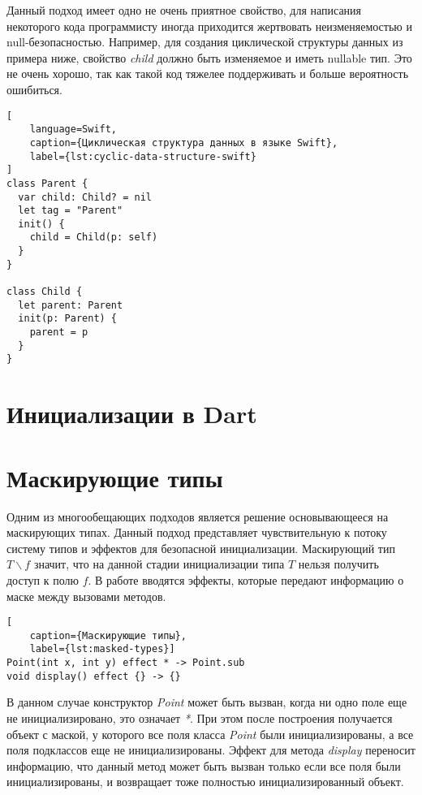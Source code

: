 Данный подход имеет одно не очень приятное свойство, для написания некоторого кода программисту иногда приходится жертвовать
неизменяемостью и null-безопасностью.
Например, для создания циклической структуры данных из примера ниже, свойство \emph{child} должно быть изменяемое и иметь nullable тип.
Это не очень хорошо, так как такой код тяжелее поддерживать и больше вероятность ошибиться.
\begin{lstlisting}[
    language=Swift,
    caption={Циклическая структура данных в языке Swift},
    label={lst:cyclic-data-structure-swift}
]
class Parent {
  var child: Child? = nil
  let tag = "Parent"
  init() {
    child = Child(p: self)
  }
}

class Child {
  let parent: Parent
  init(p: Parent) {
    parent = p
  }
}
\end{lstlisting}

\section{Инициализации в Dart}\label{sec:инициализации-в-dart}



\section{Маскирующие типы}\label{sec:маскирующие-типы}

Одним из многообещающих подходов является решение основывающееся на маскирующих типах\cite{masked-types}.
Данный подход представляет чувствительную к потоку систему типов и эффектов для безопасной инициализации.
Маскирующий тип $T \backslash f$ значит, что на данной стадии инициализации типа $T$ нельзя получить доступ к полю $f$.
В работе вводятся эффекты, которые передают информацию о маске между вызовами методов.
\begin{lstlisting}[
    caption={Маскирующие типы},
    label={lst:masked-types}]
Point(int x, int y) effect * -> Point.sub
void display() effect {} -> {}
\end{lstlisting}
В данном случае конструктор \emph{Point} может быть вызван, когда ни одно поле еще не инициализировано, это означает \emph{*}.
При этом после построения получается объект с маской, у которого все поля класса \emph{Point} были инициализированы,
а все поля подклассов еще не инициализированы.
Эффект для метода \emph{display} переносит информацию, что данный метод может быть вызван только если все поля были инициализированы,
и возвращает тоже полностью инициализированный объект.


